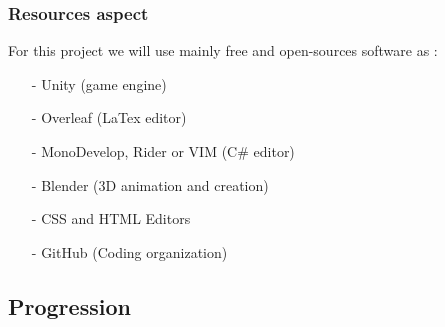 \documentclass[12pt]{article}
\begin{document}
		\subsubsection{Resources aspect}
        	For this project we will use mainly free and open-sources software as :
        		\begin{itemize}
            		\item[-] Unity (game engine)
                	\item[-] Overleaf (LaTex editor)
                	\item[-] MonoDevelop, Rider or VIM (C\# editor)
                    \item[-] Blender (3D animation and creation)
                    \item[-] CSS and HTML Editors
                    \item[-] GitHub (Coding organization)
            	\end{itemize}
\newpage


\subsection{Progression}
\end{document}

